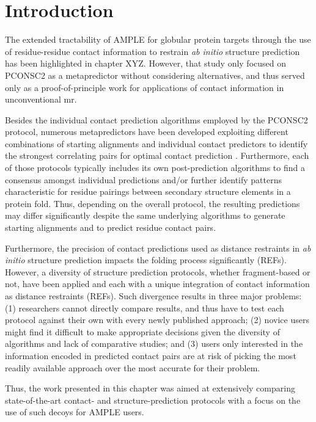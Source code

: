 \section{Introduction}
The extended tractability of AMPLE for globular protein targets through the use of residue-residue contact information to restrain \textit{ab initio} structure prediction has been highlighted in chapter XYZ. However, that study only focused on PCONSC2 as a metapredictor without considering alternatives, and thus served only as a proof-of-principle work for applications of contact information in unconventional \gls{mr}.

Besides the individual contact prediction algorithms employed by the PCONSC2 protocol, numerous metapredictors have been developed exploiting different combinations of starting alignments and individual contact predictors to identify the strongest correlating pairs for optimal contact prediction \cite{Kamisetty2013-bs, Skwark2014-mu, Jones2015-wp, Ma2015-qd, He2017-if, Michel2017-lh, Wang2017-ox}. Furthermore, each of those protocols typically includes its own post-prediction algorithms to find a consensus amongst individual predictions and/or further identify patterns characteristic for residue pairings between secondary structure elements in a protein fold. Thus, depending on the overall protocol, the resulting predictions may differ significantly despite the same underlying algorithms to generate starting alignments and to predict residue contact pairs.

Furthermore, the precision of contact predictions used as distance restraints in \textit{ab initio} structure prediction impacts the folding process significantly (REFs). However, a diversity of structure prediction protocols, whether fragment-based or not, have been applied and each with a unique integration of contact information as distance restraints (REFs). Such divergence results in three major problems: (1) researchers cannot directly compare results, and thus have to test each protocol against their own with every newly published approach; (2) novice users might find it difficult to make appropriate decisions given the diversity of algorithms and lack of comparative studies; and (3) users only interested in the information encoded in predicted contact pairs are at risk of picking the most readily available approach over the most accurate for their problem.

Thus, the work presented in this chapter was aimed at extensively comparing state-of-the-art contact- and structure-prediction protocols with a focus on the use of such decoys for AMPLE users.

